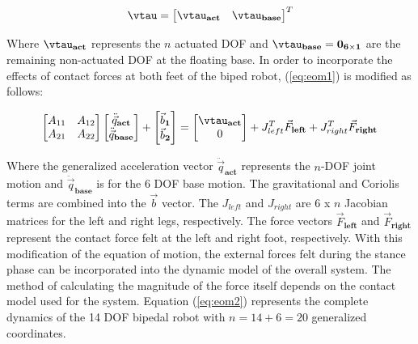\begin{equation}
	\label{eq:gentau}
	\vtau = {\begin{bmatrix} {\vtau}_{\mathbf{act}} & {\vtau}_{\mathbf{base}} \\ \end{bmatrix}}^T
\end{equation}

Where ${\vtau}_{\mathbf{act}}$ represents the $n$ actuated DOF and ${\vtau}_{\mathbf{base}} = \bf{0}_{6 \times 1} $ are the remaining non-actuated DOF at the floating base. In order to incorporate the effects of contact forces at both feet of the biped robot, (\ref{eq:eom1}) is modified as follows: 

\begin{equation}
	\label{eq:eom2}
	\begin{bmatrix} A_{11} & A_{12} \\ A_{21} & A_{22} \end{bmatrix} 
	\begin{bmatrix} \ddot{\vec{q}}_{\mathbf{act}} \\ \ddot{\vec{q}}_{\mathbf{base}} \end{bmatrix} + 
	\begin{bmatrix} \vec{b}_{\mathbf 1} \\ \vec{b}_{\mathbf 2} \end{bmatrix} = 
	\begin{bmatrix} {\vtau}_{\mathbf{act}} \\ 0 \end{bmatrix} + 
    J^{T}_{left}\vec{F}_{\mathbf{left}} + J^{T}_{right}\vec{F}_{\mathbf{right}}
\end{equation}

Where the generalized acceleration vector $\ddot{\vec{q}}_{\mathbf{act}}$ represents the $n$-DOF joint motion and $\ddot{\vec{q}}_{\mathbf{base}}$ is for the 6 DOF base motion. The gravitational and Coriolis terms are combined into the $\vec{b}$ vector. The $J_{left}$ and $J_{right}$ are 6 x $n$ Jacobian matrices for the left and right legs, respectively. The force vectors $\vec{F}_{\mathbf{left}}$ and $\vec{F}_{\mathbf{right}}$ represent the contact force felt at the left and right foot, respectively. With this modification of the equation of motion, the external forces felt during the stance phase can be incorporated into the dynamic model of the overall system. The method of calculating the magnitude of the force itself depends on the contact model used for the system. Equation (\ref{eq:eom2}) represents the complete dynamics of the 14 DOF bipedal robot with $n = 14 + 6 = 20$ generalized coordinates.

